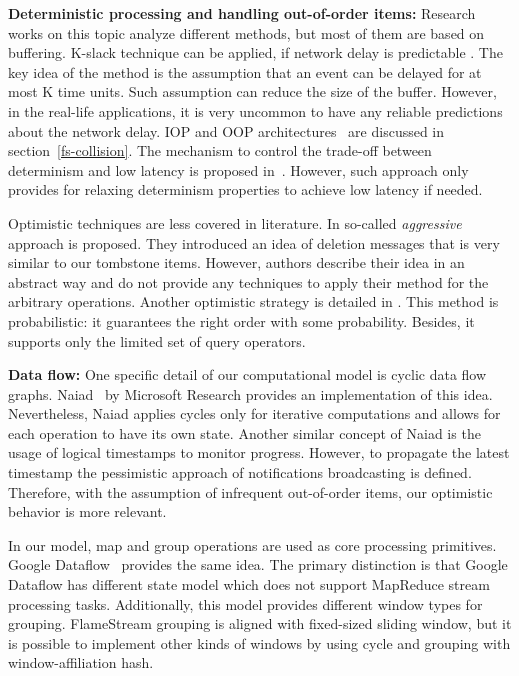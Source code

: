 
\label {fs-related-section}

{\bf Deterministic processing and handling out-of-order items:}
Research works on this topic analyze different methods, but most of them are based on buffering. K-slack technique can be applied, if network delay is predictable \cite{Babu:2004:EKC:1016028.1016032}. The key idea of the method is the assumption that an event can be delayed for at most K time units. Such assumption can reduce the size of the buffer. However, in the real-life applications, it is very uncommon to have any reliable predictions about the network delay. IOP and OOP architectures~\cite{Cranor:2003:GSD:872757.872838, Arasu:2006:CCQ:1146461.1146463, Li:2008:OPN:1453856.1453890} are discussed in section~\ref{fs-collision}. The mechanism to control the trade-off between determinism and low latency is proposed in~\cite{Zacheilas:2017:MDS:3093742.3093921}. However, such approach only provides for relaxing determinism properties to achieve low latency if needed.

Optimistic techniques are less covered in literature. In \cite{Wei:2009:SSO:1559845.1559973} so-called {\it aggressive} approach is proposed. They introduced an idea of deletion messages that is very similar to our tombstone items. However, authors describe their idea in an abstract way and do not provide any techniques to apply their method for the arbitrary operations. Another optimistic strategy is detailed in \cite{Li2011}. This method is probabilistic: it guarantees the right order with some probability. Besides, it supports only the limited set of query operators.

{\bf Data flow:}
One specific detail of our computational model is cyclic data flow graphs. Naiad~\cite{Murray:2013:NTD:2517349.2522738} by Microsoft Research provides an implementation of this idea. Nevertheless, Naiad applies cycles only for iterative computations and allows for each operation to have its own state. Another similar concept of Naiad is the usage of logical timestamps to monitor progress. However, to propagate the latest timestamp the pessimistic approach of notifications broadcasting is defined. Therefore, with the assumption of infrequent out-of-order items, our optimistic behavior is more relevant.

In our model, map and group operations are used as core processing primitives. Google Dataflow~\cite{Akidau:2015:DMP:2824032.2824076} provides the same idea. The primary distinction is that Google Dataflow has different state model which does not support MapReduce stream processing tasks. Additionally, this model provides different window types for grouping. FlameStream grouping is aligned with fixed-sized sliding window, but it is possible to implement other kinds of windows by using cycle and grouping with window-affiliation hash.
